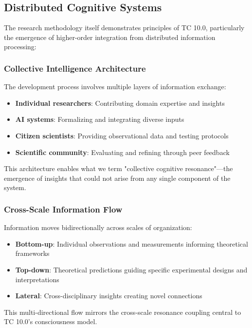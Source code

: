 \documentclass[12pt]{article}
\begin{document}
\subsection{Distributed Cognitive Systems}

The research methodology itself demonstrates principles of TC 10.0, particularly the emergence of higher-order integration from distributed information processing:

\subsubsection{Collective Intelligence Architecture}

The development process involves multiple layers of information exchange:

\begin{itemize}
    \item \textbf{Individual researchers}: Contributing domain expertise and insights
    \item \textbf{AI systems}: Formalizing and integrating diverse inputs
    \item \textbf{Citizen scientists}: Providing observational data and testing protocols
    \item \textbf{Scientific community}: Evaluating and refining through peer feedback
\end{itemize}

This architecture enables what we term "collective cognitive resonance"—the emergence of insights that could not arise from any single component of the system.

\subsubsection{Cross-Scale Information Flow}

Information moves bidirectionally across scales of organization:

\begin{itemize}
    \item \textbf{Bottom-up}: Individual observations and measurements informing theoretical frameworks
    \item \textbf{Top-down}: Theoretical predictions guiding specific experimental designs and interpretations
    \item \textbf{Lateral}: Cross-disciplinary insights creating novel connections
\end{itemize}

This multi-directional flow mirrors the cross-scale resonance coupling central to TC 10.0's consciousness model.
\end{document}
